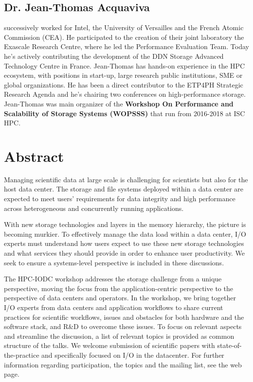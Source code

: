 \documentclass[a4paper,10pt]{article}
\begin{document}
\subsection{Dr. Jean-Thomas Acquaviva}
successively worked for Intel, the University of Versailles and the French Atomic Commission (CEA). He participated to the creation of their joint laboratory the Exascale Research Centre, where he led the Performance Evaluation Team. Today he’s actively contributing the development of the DDN Storage Advanced Technology Centre in France. Jean-Thomas has hands-on experience in the HPC ecosystem, with positions in start-up, large research public institutions, SME or global organizations. He has been a direct contributor to the ETP4PH Strategic Research Agenda and he’s chairing two conferences on high-performance storage.
Jean-Thomas was main organizer of the \textbf{Workshop On Performance and Scalability of Storage Systems (WOPSSS)} that run from 2016-2018 at ISC HPC.

\section{Abstract}
Managing scientific data at large scale is challenging for scientists but also for the host data center.
The storage and file systems deployed within a data center are expected to meet users' requirements for data integrity and high performance across heterogeneous and concurrently running applications.

With new storage technologies and layers in the memory hierarchy, the picture is becoming murkier.
To effectively manage the data load within a data center, I/O experts must understand how users expect to use these new storage technologies and what services they should provide in order to enhance user productivity. We seek to ensure a systems-level perspective is included in these discussions.

The HPC-IODC workshop addresses the storage challenge from a unique perspective, moving the focus from the application-centric perspective to the perspective of data centers and operators.
In the workshop, we bring together I/O experts from data centers and application workflows to share current practices for scientific workflows, issues and obstacles for both hardware and the software stack, and R\&D to overcome these issues.
To focus on relevant aspects and streamline the discussion, a list of relevant topics is provided as common structure of the talks.
We welcome submission of scientific papers with state-of-the-practice and specifically focused on I/O in the datacenter.
For further information regarding participation, the topics and the mailing list, see the web page.
\end{document}
